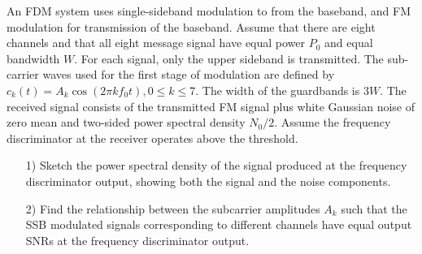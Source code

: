 \documentclass{assignment}
\begin{document}
\begin{prob}
    An FDM system uses single-sideband modulation to from the baseband, and FM modulation for transmission of the baseband. Assume that there are eight channels and that all eight message signal have equal power $P_0$ and equal bandwidth $W$. For each signal, only the upper sideband is transmitted. The sub-carrier waves used for the first stage of modulation are defined by $c_k(t)=A_k\cos(2\pi kf_0t),0\leq k\leq 7$. The width of the guardbands is $3W$. The received signal consists of the transmitted FM signal plus white Gaussian noise of zero mean and two-sided power spectral density $N_0/2$. Assume the frequency discriminator at the receiver operates above the threshold.
    \begin{itemize}
        \item[1)] Sketch the power spectral density of the signal produced at the frequency discriminator output, showing both the signal and the noise components.
        \item[2)] Find the relationship between the subcarrier amplitudes $A_k$ such that the SSB modulated signals corresponding to different channels have equal output SNRs at the frequency discriminator output.
    \end{itemize}
\end{prob}
\end{document}

